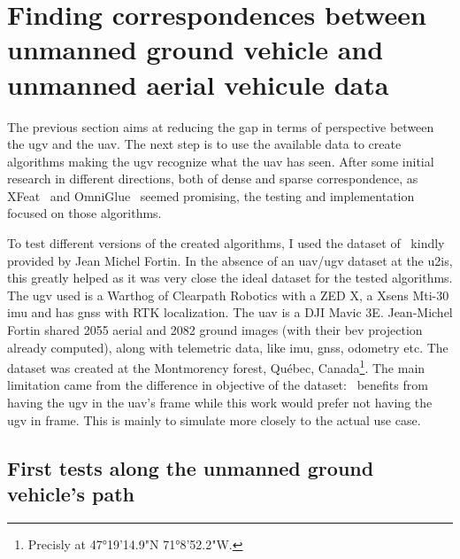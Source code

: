 \chapter{Finding correspondences between unmanned ground vehicle and unmanned aerial vehicule data}\label{ch:finding-correspondances-between-ugv-and-uav-data}

The previous section aims at reducing the gap in terms of perspective between the \gls{ugv} and the \gls{uav}.
The next step is to use the available data to create algorithms making the \gls{ugv} recognize what the \gls{uav} has seen.
After some initial research in different directions, both of dense and sparse correspondence, as XFeat~\cite{potje_xfeat_2024}
and OmniGlue~\cite{jiang_omniglue_2024} seemed promising, the testing and implementation focused on those algorithms.

To test different versions of the created algorithms, I used the dataset of~\textcite{fortin_uav-assisted_2024} kindly provided by Jean Michel Fortin.
In the absence of an \gls{uav}/\gls{ugv} dataset at the \gls{u2is}, this greatly helped as it was very close the ideal
dataset for the tested algorithms.
The \gls{ugv} used is a Warthog of Clearpath Robotics with a ZED X, a Xsens Mti-30 \gls{imu} and has \gls{gnss} with RTK localization.
The \gls{uav} is a DJI Mavic 3E.
Jean-Michel Fortin shared 2055 aerial and 2082 ground images (with their \gls{bev} projection already computed), along
with telemetric data, like \gls{imu}, \gls{gnss}, odometry etc.
The dataset was created at the Montmorency forest, Québec, Canada\footnote{Precisly at 47°19'14.9"N 71°8'52.2"W.}.
The main limitation came from the difference in objective of the dataset:~\textcite{fortin_uav-assisted_2024} benefits from
having the \gls{ugv} in the \gls{uav}'s frame while this work would prefer not having the \gls{ugv} in frame.
This is mainly to simulate more closely to the actual use case.


\section{First tests along the unmanned ground vehicle's path}

